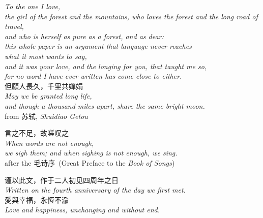 \documentclass[11pt,a4paper]{article}
\begin{document}
\clearpage
\thispagestyle{empty}
\vspace*{0.20\textheight}
\begin{center}
{\itshape\color{ink}
To the one I love,\\[0.4em]
the girl of the forest and the mountains, who loves the forest and the long road of travel,\\[0.25em]
and who is herself as pure as a forest, and as dear:\\[0.25em]
this whole paper is an argument that language never reaches\\[0.25em]
what it most wants to say,\\[0.25em]
and it was your love, and the longing for you, that taught me so,\\[0.25em]
for no word I have ever written has come close to either.\\}
\vspace{2.6em}
{\cjkfont\large\color{rosedeep} 但願人長久，千里共嬋娟}\\[0.8em]
{\itshape\small\color{rosedeep}
May we be granted long life,\\[0.18em]
and though a thousand miles apart, share the same bright moon.}\\[1.0em]
{\footnotesize\color{sage}from \cjkfont 苏轼\/{\normalfont, \textit{Shuidiao Getou}}}
\vspace{2.4em}

{\cjkfont\large\color{rosedeep} 言之不足，故嗟叹之}\\[0.8em]
{\itshape\small\color{rosedeep}
When words are not enough,\\[0.18em]
we sigh them; and when sighing is not enough, we sing.}\\[1.0em]
{\footnotesize\color{sage}after the \cjkfont 毛诗序\/{\normalfont\ (Great Preface to the \textit{Book of Songs})}}
\vspace{2.8em}

{\cjkfont\color{rosedeep} 谨以此文，作于二人初见四周年之日}\\[0.5em]
{\itshape\small\color{ink}
Written on the fourth anniversary of the day we first met.}\\[1.4em]
{\cjkfont\large\color{rosedeep} 愛與幸福，永恆不渝}\\[0.6em]
{\itshape\small\color{rosedeep}
Love and happiness, unchanging and without end.}
\end{center}
\vfill
\clearpage
\end{document}
